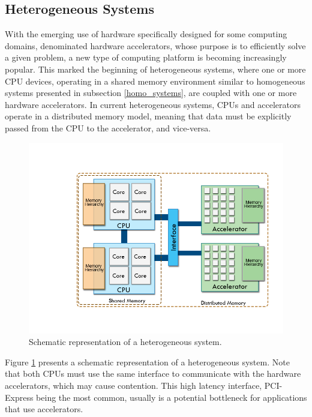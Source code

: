 \subsection{Heterogeneous Systems}
\label{hetero_systems}

With the emerging use of hardware specifically designed for some computing domains, denominated hardware accelerators, whose purpose is to efficiently solve a given problem, a new type of computing platform is becoming increasingly popular. This marked the beginning of heterogeneous systems, where one or more CPU devices, operating in a shared memory environment similar to homogeneous systems presented in subsection \ref{homo_systems}, are coupled with one or more hardware accelerators. In current heterogeneous systems, CPUs and accelerators operate in a distributed memory model, meaning that data must be explicitly passed from the CPU to the accelerator, and vice-versa.

\begin{figure}[!htp]
	\begin{center}
		\includegraphics[scale=0.45]{imgs/heteroplats.png}
		\caption{Schematic representation of a heterogeneous system.}
		\label{fig:heteroplat}
	\end{center}
\end{figure}

Figure \ref{fig:heteroplat} presents a schematic representation of a heterogeneous system. Note that both CPUs must use the same interface to communicate with the hardware accelerators, which may cause contention. This high latency interface, PCI-Express being the most common, usually is a potential bottleneck for applications that use accelerators.

